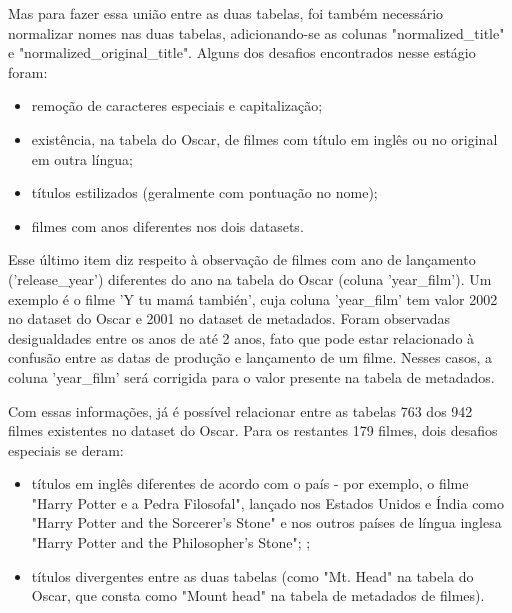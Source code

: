             Mas para fazer essa união entre as duas tabelas, foi também necessário normalizar nomes nas duas tabelas, adicionando-se as colunas "normalized\_title" e "normalized\_original\_title". Alguns dos desafios encontrados nesse estágio foram:

            \begin{itemize}
                \item remoção de caracteres especiais e capitalização;
                \item existência, na tabela do Oscar, de filmes com título em inglês ou no original em outra língua;
                \item títulos estilizados (geralmente com pontuação no nome);
                \item filmes com anos diferentes nos dois datasets.
            \end{itemize}

            Esse último item diz respeito à observação de filmes com ano de lançamento ('release\_year') diferentes do ano na tabela do Oscar (coluna 'year\_film'). Um exemplo é o filme 'Y tu mamá también', cuja coluna 'year\_film' tem valor 2002 no dataset do Oscar e 2001 no dataset de metadados. Foram observadas desigualdades entre os anos de até 2 anos, fato que pode estar relacionado à confusão entre as datas de produção e lançamento de um filme. Nesses casos, a coluna 'year\_film' será corrigida para o valor presente na tabela de metadados.


            Com essas informações, já é possível relacionar entre as tabelas 763 dos 942 filmes existentes no dataset do Oscar. Para os restantes 179 filmes, dois desafios especiais se deram:\par

            \begin{itemize}
                \item títulos em inglês diferentes de acordo com o país - por exemplo, o filme "Harry Potter e a Pedra Filosofal", lançado nos Estados Unidos e Índia como "Harry Potter and the Sorcerer's Stone" e nos outros países de língua inglesa "Harry Potter and the Philosopher's Stone"; \cite{yahoo2000};\par
                \item títulos divergentes entre as duas tabelas (como "Mt. Head" na tabela do Oscar, que consta como "Mount head" na tabela de metadados de filmes).\par
            \end{itemize}

